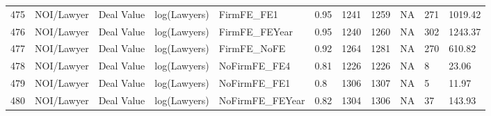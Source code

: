 \begin{table}[ht]
\begin{tabular}{rllllllllll}
  475 & NOI/Lawyer & Deal Value & log(Lawyers) & FirmFE\_FE1 & 0.95 & 1241 & 1259 & NA & 271 & 1019.42 \\ 
  476 & NOI/Lawyer & Deal Value & log(Lawyers) & FirmFE\_FEYear & 0.95 & 1240 & 1260 & NA & 302 & 1243.37 \\ 
  477 & NOI/Lawyer & Deal Value & log(Lawyers) & FirmFE\_NoFE & 0.92 & 1264 & 1281 & NA & 270 & 610.82 \\ 
  478 & NOI/Lawyer & Deal Value & log(Lawyers) & NoFirmFE\_FE4 & 0.81 & 1226 & 1226 & NA & 8 & 23.06 \\ 
  479 & NOI/Lawyer & Deal Value & log(Lawyers) & NoFirmFE\_FE1 & 0.8 & 1306 & 1307 & NA & 5 & 11.97 \\ 
  480 & NOI/Lawyer & Deal Value & log(Lawyers) & NoFirmFE\_FEYear & 0.82 & 1304 & 1306 & NA & 37 & 143.93 \\ 
   \hline
\end{tabular}
\end{table}
